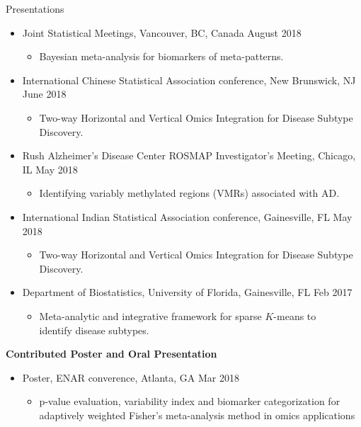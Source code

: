 \documentclass{resume} %
\begin{document}
\begin{rSection}{Presentations}
\begin{itemize}[noitemsep,topsep=0pt]
\item  Joint Statistical Meetings, Vancouver, BC, Canada  \hfill {August 2018}
\begin{itemize}[noitemsep,topsep=0pt]
\item{Bayesian meta-analysis for biomarkers of meta-patterns.}
\end{itemize}

\item  International Chinese Statistical Association conference, New Brunswick, NJ  \hfill {June 2018}
\begin{itemize}[noitemsep,topsep=0pt]
\item{Two-way Horizontal and Vertical Omics Integration for Disease Subtype Discovery.}
\end{itemize}


\item  Rush Alzheimer's Disease Center ROSMAP Investigator's Meeting, Chicago, IL  \hfill {May 2018}
\begin{itemize}[noitemsep,topsep=0pt]
\item{Identifying variably methylated regions (VMRs) associated with AD.}
\end{itemize}

\item  International Indian Statistical Association conference, Gainesville, FL \hfill {May 2018}
\begin{itemize}[noitemsep,topsep=0pt]
\item{Two-way Horizontal and Vertical Omics Integration for Disease Subtype Discovery.}
\end{itemize}

\item  Department of Biostatistics, University of Florida, Gainesville, FL \hfill {Feb 2017}
\begin{itemize}[noitemsep,topsep=0pt]
\item{Meta-analytic and integrative framework for sparse $K$-means to\\ identify disease subtypes.}
\end{itemize}


\end{itemize}


\textbf{Contributed Poster and Oral Presentation}

\begin{itemize}[noitemsep,topsep=0pt]


\item  Poster, ENAR converence, Atlanta, GA \hfill {Mar 2018}
\begin{itemize}[noitemsep,topsep=0pt]
\item{p-value evaluation, variability index and biomarker categorization for \\adaptively
weighted Fisher's meta-analysis method in omics applications}
\end{itemize}



\end{itemize}
\end{rSection}
\end{document}
